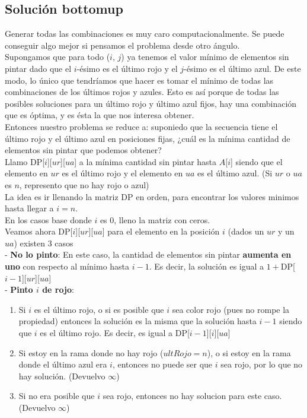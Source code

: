 \subsection{Solución bottomup}

Generar todas las combinaciones es muy caro computacionalmente. Se puede conseguir algo mejor si pensamos el problema desde otro ángulo. \\

Supongamos que para todo ($i$, $j$) ya tenemos el valor mínimo de elementos sin pintar dado que el $i$-ésimo es el último rojo y el $j$-ésimo es el último azul. De este modo, lo único que tendríamos que hacer es tomar el mínimo de todas las combinaciones de los últimos rojos y azules. Esto es así porque de todas las posibles soluciones para un último rojo y último azul fijos, hay una combinación que es óptima, y es ésta la que nos interesa obtener. \\

Entonces nuestro problema se reduce a: suponiedo que la secuencia tiene el último rojo y el último azul en posiciones fijas, ¿cuál es la mínima cantidad de elementos sin pintar que podemos obtener? \\

Llamo DP[$i$][$ur$][$ua$] a la mínima cantidad sin pintar hasta $A$[$i$] siendo que el elemento en $ur$ es el último rojo y el elemento en $ua$ es el último azul. (Si $ur$ o $ua$ es $n$, represento que no hay rojo o azul) \\

La idea es ir llenando la matriz DP en orden, para encontrar los valores minimos hasta llegar a $i = n$. \\

En los casos base donde $i$ es 0, lleno la matriz con ceros. \\

Veamos ahora DP[$i$][$ur$][$ua$] para el elemento en la posición $i$ (dados un $ur$ y un $ua$) existen 3 casos \\

- \textbf{No lo pinto}: En este caso, la cantidad de elementos sin pintar \textbf{aumenta en uno} con respecto al mínimo hasta $i-1$. Es decir, la solución es igual a $1 + $DP[$i-1$][$ur$][$ua$] \\

- \textbf{Pinto $i$ de rojo}: 
\begin{enumerate}
\item Si $i$ es el último rojo, o si es posible que $i$ sea color rojo (pues no rompe la propiedad) entonces la solución es la misma que la solución hasta $i-1$ siendo que $i$ es el último rojo. Es decir, es igual a DP[$i-1$][$i$][$ua$]
\item Si estoy en la rama donde no hay rojo ($ultRojo = n$), o si estoy en la rama donde el último azul era $i$, entonces no puede ser que $i$ sea rojo, por lo que no hay solución. (Devuelvo $\infty$)
\item Si no era posible que $i$ sea rojo, entonces no hay solucion para este caso. (Devuelvo $\infty$)
\end{enumerate} 

